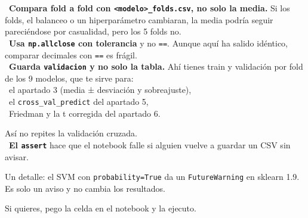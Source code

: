 \documentclass[11pt,a4paper]{article}
\begin{document}
{\hspace*{1.0em}\textbullet~\textbf{Compara fold a fold con \texttt{\textless{}modelo\textgreater{}\_\allowbreak{}folds.csv}, no solo la media.} Si los folds, el balanceo o un hiperparámetro cambiaran, la media podría seguir pareciéndose por casualidad, pero los 5 folds no. \\{}
\hspace*{1.0em}\textbullet~\textbf{Usa \texttt{np.allclose} con tolerancia} y no \texttt{==}. Aunque aquí ha salido idéntico, comparar decimales con \texttt{==} es frágil. \\{}
\hspace*{1.0em}\textbullet~\textbf{Guarda \texttt{validacion} y no solo la tabla.} Ahí tienes train y validación por fold de los 9 modelos, que te sirve para: \\{}
\hspace*{2.0em}\textbullet~el apartado 3 (media ± desviación y sobreajuste), \\{}
\hspace*{2.0em}\textbullet~el \texttt{cross\_\allowbreak{}val\_\allowbreak{}predict} del apartado 5, \\{}
\hspace*{2.0em}\textbullet~Friedman y la t corregida del apartado 6.

  Así no repites la validación cruzada. \\{}
\hspace*{1.0em}\textbullet~\textbf{El \texttt{assert}} hace que el notebook falle si alguien vuelve a guardar un CSV sin avisar.

Un detalle: el SVM con \texttt{probability=True} da un \texttt{FutureWarning} en sklearn 1.9. Es solo un aviso y no cambia los resultados.

Si quieres, pego la celda en el notebook y la ejecuto.

}
\end{document}
